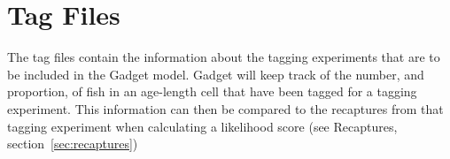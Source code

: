 \documentclass [a4paper, 10pt]{book}
\begin{document}








\chapter{Tag Files}\label{chap:tag}
The tag files contain the information about the tagging experiments that are to be included in the Gadget model.  Gadget will keep track of the number, and proportion, of fish in an age-length cell that have been tagged for a tagging experiment.  This information can then be compared to the recaptures from that tagging experiment when calculating a likelihood score (see Recaptures, section~\ref{sec:recaptures})
\end{document}
